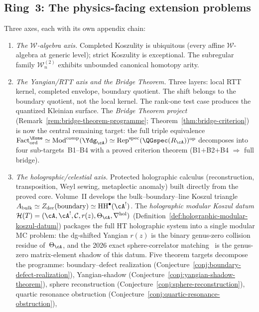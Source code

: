 \subsection*{Ring~3: The physics-facing extension problems}
Three axes, each with its own appendix chain:
\begin{enumerate}
\item \emph{The $\mathcal{W}$-algebra axis.}
  Completed Koszulity is ubiquitous (every affine
  $\mathcal{W}$-algebra at generic level); strict Koszulity is
  exceptional.  The subregular family
  $\mathcal{W}_n^{(2)}$ exhibits unbounded canonical homotopy
  arity.
\item \emph{The Yangian/RTT axis and the Bridge Theorem.}
  Three layers: local RTT kernel, completed envelope, boundary
  quotient.  The shift belongs to the boundary quotient, not
  the local kernel.  The rank-one test case produces the
  quantized Kleinian surface.
  The \emph{Bridge Theorem project}
  (Remark~\ref{rem:bridge-theorem-programme};
  Theorem~\ref{thm:bridge-criterion})
  is now the central remaining target: the full triple
  equivalence
  $\mathrm{Fact}^{\Eone}_{\mathrm{ord}} \simeq
  \mathrm{Mod}^{\mathrm{comp}}(\Ydg_\cA) \simeq
  \mathrm{Rep}^{\mathrm{spec}}(\QGspec(R_\cA))^{\mathrm{op}}$
  decomposes into four sub-targets~B1--B4 with a proved criterion
  theorem (B1$+$B2$+$B4 $\Rightarrow$ full bridge).
\item \emph{The holographic/celestial axis.}
  Protected holographic calculus (reconstruction, transposition,
  Weyl sewing, metaplectic anomaly) built directly from the
  proved core.
  Volume~II develops the bulk--boundary--line Koszul triangle
  $A_{\mathrm{bulk}} \simeq Z_{\mathrm{der}}(\text{boundary})
  \simeq \mathrm{HH}^\bullet(\cA^!)$.
  The \emph{holographic modular Koszul datum}
  $\mathcal{H}(T) = (\cA, \cA^!, \mathcal{C}, r(z), \Theta_\cA,
  \nabla^{\mathrm{hol}})$
  (Definition~\ref{def:holographic-modular-koszul-datum})
  packages the full HT holographic system into a single modular
  MC problem: the dg-shifted Yangian $r(z)$ is the binary
  genus-zero collision residue of~$\Theta_\cA$, and the 2026
  exact sphere-correlator matching~\cite{GZ26} is the genus-zero
  matrix-element shadow of this datum.  Five theorem targets
  decompose the programme: boundary--defect realization
  (Conjecture~\ref{conj:boundary-defect-realization}),
  Yangian-shadow
  (Conjecture~\ref{conj:yangian-shadow-theorem}),
  sphere reconstruction
  (Conjecture~\ref{conj:sphere-reconstruction}),
  quartic resonance obstruction
  (Conjecture~\ref{conj:quartic-resonance-obstruction}),

\end{enumerate}
